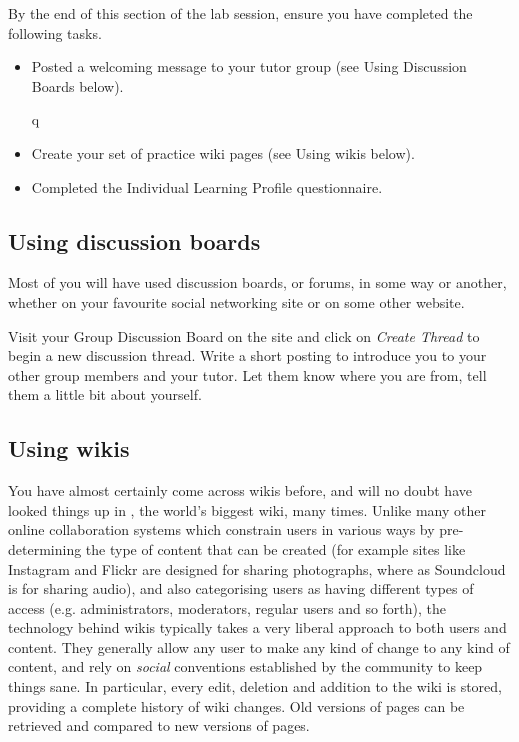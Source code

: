 \begin{firstonly}
By the end of this section of the lab session, ensure you have completed the following tasks.

\begin{itemize}

\item Posted a welcoming message to your tutor group (see Using
Discussion Boards below).

q\item Create your set of practice wiki pages (see Using wikis below).

\item Completed the Individual Learning Profile questionnaire.

\end{itemize}

\subsection{Using discussion boards}
\label{sec:using-forums}

Most of you will have used discussion boards, or forums, in some way
or another, whether on your favourite social networking site or on
some other website.

Visit your Group Discussion Board on the  site
and click on \emph{Create Thread} to begin a new discussion
thread. Write a short posting to introduce you to your other group
members and your tutor. Let them know where you are from, tell them a
little bit about yourself.

\subsection{Using wikis}
\label{sec:using-wikis}

You have almost certainly come across wikis before, and will no doubt
have looked things up in , the world's
biggest wiki, many times. Unlike many other online collaboration
systems which constrain users in various ways by pre-determining the
type of content that can be created (for example sites like Instagram
and Flickr are designed for sharing photographs, where as Soundcloud
is for sharing audio), and also categorising users as having different
types of access (e.g. administrators, moderators, regular users and so
forth), the technology behind wikis typically takes a very liberal
approach to both users and content. They generally allow any user to
make any kind of change to any kind of content, and rely on
\textit{social} conventions established by the community to keep
things sane. In particular, every edit, deletion and addition to the
wiki is stored, providing a complete history of wiki changes. Old
versions of pages can be retrieved and compared to new versions of
pages.


\end{firstonly}
